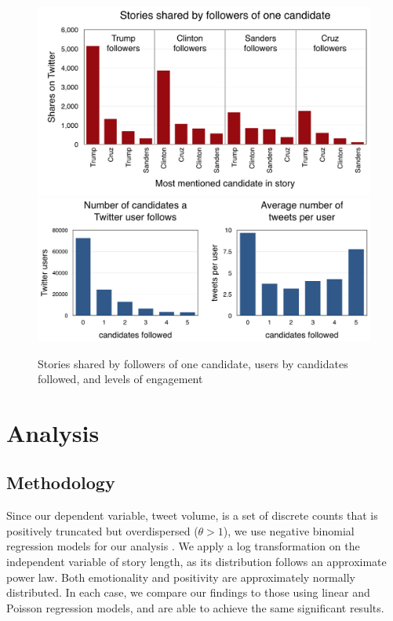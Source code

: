 \documentclass[letterpaper]{article}
\begin{document}
\begin{figure}[t!] 
\centering 
 \includegraphics[width=1.0\columnwidth]{who-shares-what-medium}  
  \includegraphics[width=\columnwidth]{levels-of-engagement-charts}  
  \caption{Stories shared by followers of one candidate, users by candidates followed, and levels of engagement
    \label{fig:levels-of-engagement-charts}}
\end{figure}

\section{Analysis}  
\subsection{Methodology}
Since our dependent variable, tweet volume, is a set of discrete counts that is positively truncated but overdispersed ($\theta > 1$), we use negative binomial regression models for our analysis \cite{scott1997regression}. We apply a log transformation on the independent variable of story length, as its distribution follows an approximate power law. Both emotionality and positivity are approximately normally distributed. In each case, we compare our findings to those using linear and Poisson regression models, and are able to achieve the same significant results. 
 
\end{document}
